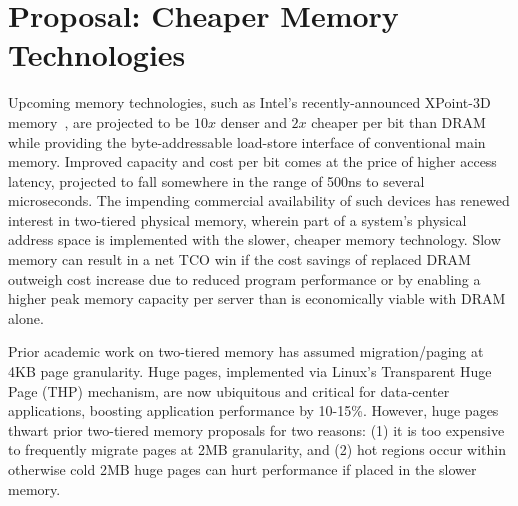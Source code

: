 \section{Proposal: Cheaper Memory Technologies}
Upcoming memory technologies, such as Intel's recently-announced XPoint-3D
memory~\cite{xpoint}, are projected to be $10x$ denser and $2x$ cheaper per
bit than DRAM while providing the byte-addressable load-store interface of
conventional main memory.  Improved capacity and cost per bit comes at the price
of higher access latency, projected to fall somewhere in the range of 500ns to
several microseconds.  The impending commercial availability of such devices has
renewed interest in two-tiered physical memory, wherein part of a system's
physical address space is implemented with the slower, cheaper memory
technology.  Slow memory can result in a net TCO win if the cost savings of
replaced DRAM outweigh cost increase due to reduced program performance or by
enabling a higher peak memory capacity per server than is economically viable
with DRAM alone.  



Prior academic work on two-tiered memory has assumed migration/paging at 4KB
page granularity.  Huge pages, implemented via Linux's Transparent Huge Page
(THP) mechanism, are now ubiquitous and critical for data-center applications,
boosting application performance by 10-15\%.
However, huge pages thwart prior two-tiered memory proposals for two reasons:
(1) it is too expensive to frequently migrate pages at 2MB granularity, and (2)
hot regions occur within otherwise cold 2MB huge pages can hurt performance if
placed in the slower memory. 

